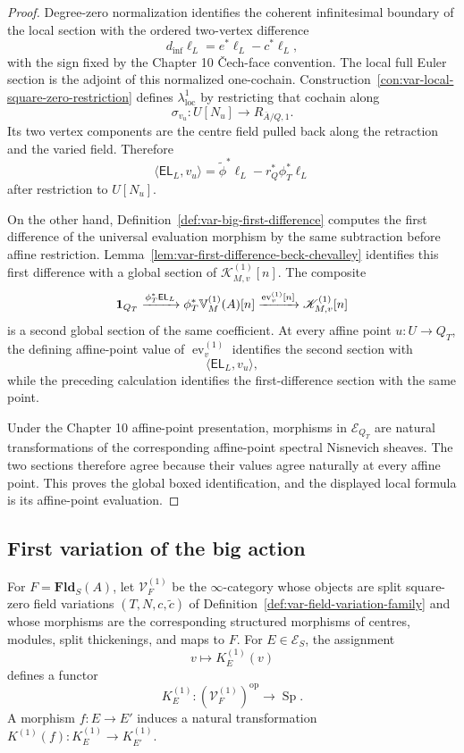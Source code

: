 \begin{proof}
Degree-zero normalization identifies the coherent infinitesimal boundary of the local section with the ordered two-vertex difference
\[
    d_{\mathrm{inf}}\ell_L
    =
    e^*\ell_L-c^*\ell_L,
\]
with the sign fixed by the Chapter 10 \v{C}ech-face convention. The local full Euler section is the adjoint of this normalized one-cochain. Construction~\ref{con:var-local-square-zero-restriction} defines \(\lambda^1_{\mathrm{loc}}\) by restricting that cochain along
\[
    \sigma_{v_u}:U[N_u]\to R_{\bar A/Q,1}.
\]
Its two vertex components are the centre field pulled back along the retraction and the varied field. Therefore
\[
    \langle\mathsf{EL}_L,v_u\rangle
    =
    \widetilde\phi^*\ell_L
    -
    r_Q^*\phi_T^*\ell_L
\]
after restriction to \(U[N_u]\).

On the other hand, Definition~\ref{def:var-big-first-difference} computes the first difference of the universal evaluation morphism by the same subtraction before affine restriction. Lemma~\ref{lem:var-first-difference-beck-chevalley} identifies this first difference with a global section of \(\mathscr K^{(1)}_{M,v}[n]\). The composite
\[
    \mathbf 1_{Q_T}
    \xrightarrow{\phi_T^*\mathsf{EL}_L}
    \phi_T^*\mathbb V^{(1)}_M(A)[n]
    \xrightarrow{\operatorname{ev}^{(1)}_v[n]}
    \mathscr K^{(1)}_{M,v}[n]
\]
is a second global section of the same coefficient. At every affine point \(u:U\to Q_T\), the defining affine-point value of \(\operatorname{ev}^{(1)}_v\) identifies the second section with
\[
    \langle\mathsf{EL}_L,v_u\rangle,
\]
while the preceding calculation identifies the first-difference section with the same point.

Under the Chapter 10 affine-point presentation, morphisms in \(\mathcal E_{Q_T}\) are natural transformations of the corresponding affine-point spectral Nisnevich sheaves. The two sections therefore agree because their values agree naturally at every affine point. This proves the global boxed identification, and the displayed local formula is its affine-point evaluation.
\end{proof}

\subsection{First variation of the big action}

\begin{definition}
\label{def:var-field-first-variation-category}
For \(F=\mathbf{Fld}_S(A)\), let \(\mathcal V_F^{(1)}\) be the \(\infty\)-category whose objects are split square-zero field variations \((T,N,c,\widetilde c)\) of Definition~\ref{def:var-field-variation-family} and whose morphisms are the corresponding structured morphisms of centres, modules, split thickenings, and maps to \(F\). For \(E\in\mathcal E_S\), the assignment
\[
    v\longmapsto K_E^{(1)}(v)
\]
defines a functor
\[
    K_E^{(1)}:(\mathcal V_F^{(1)})^{\mathrm{op}}\to\operatorname{Sp}.
\]
A morphism \(f:E\to E'\) induces a natural transformation \(K^{(1)}(f):K_E^{(1)}\to K_{E'}^{(1)}\).
\end{definition}

